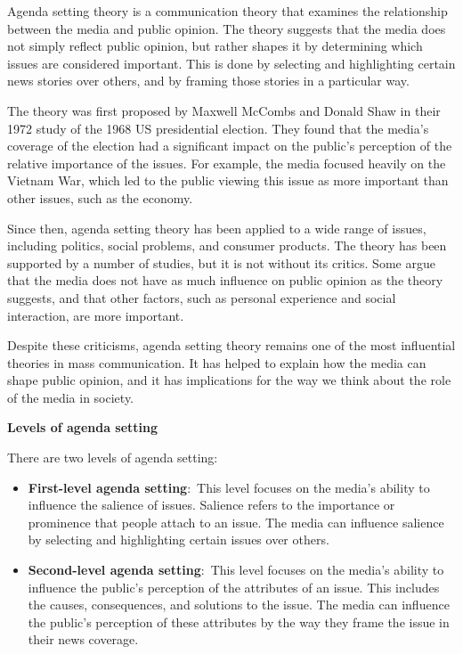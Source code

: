 \documentclass[
  b5paper]{book}
\begin{document}
Agenda setting theory is a communication theory that examines the relationship between the media and public opinion. The theory suggests that the media does not simply reflect public opinion, but rather shapes it by determining which issues are considered important. This is done by selecting and highlighting certain news stories over others, and by framing those stories in a particular way.

The theory was first proposed by Maxwell McCombs and Donald Shaw in their 1972 study of the 1968 US presidential election. They found that the media's coverage of the election had a significant impact on the public's perception of the relative importance of the issues. For example, the media focused heavily on the Vietnam War, which led to the public viewing this issue as more important than other issues, such as the economy.

Since then, agenda setting theory has been applied to a wide range of issues, including politics, social problems, and consumer products. The theory has been supported by a number of studies, but it is not without its critics. Some argue that the media does not have as much influence on public opinion as the theory suggests, and that other factors, such as personal experience and social interaction, are more important.

Despite these criticisms, agenda setting theory remains one of the most influential theories in mass communication. It has helped to explain how the media can shape public opinion, and it has implications for the way we think about the role of the media in society.

\textbf{Levels of agenda setting}

There are two levels of agenda setting:

\begin{itemize}
\item
  \textbf{First-level agenda setting}:~This level focuses on the media's ability to influence the salience of issues. Salience refers to the importance or prominence that people attach to an issue. The media can influence salience by selecting and highlighting certain issues over others.
\item
  \textbf{Second-level agenda setting}:~This level focuses on the media's ability to influence the public's perception of the attributes of an issue. This includes the causes, consequences, and solutions to the issue. The media can influence the public's perception of these attributes by the way they frame the issue in their news coverage.
\end{itemize}
\end{document}
